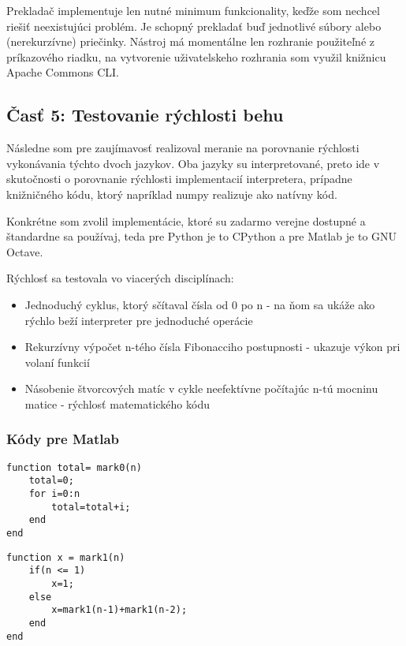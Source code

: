 \documentclass[12pt,a4paper]{article}
\begin{document}
Prekladač implementuje len nutné minimum funkcionality, keďže som nechcel riešiť neexistujúci problém.
Je schopný prekladať buď jednotlivé súbory alebo (nerekurzívne) priečinky.
Nástroj má momentálne len rozhranie použiteľné z príkazového riadku, na vytvorenie uživatelskeho rozhrania som využil knižnicu Apache Commons CLI.

\subsection*{Časť 5: Testovanie rýchlosti behu}

Následne som pre zaujímavosť realizoval meranie na porovnanie rýchlosti vykonávania týchto dvoch jazykov.
Oba jazyky su interpretované, preto ide v skutočnosti o porovnanie rýchlosti implementacií interpretera, prípadne knižničného kódu, ktorý napríklad numpy realizuje ako natívny kód.

Konkrétne som zvolil implementácie, ktoré su zadarmo verejne dostupné a štandardne sa používaj, teda pre Python je to CPython a pre Matlab je to GNU Octave.

Rýchlosť sa testovala vo viacerých disciplínach:
\begin{itemize}
    \item Jednoduchý cyklus, ktorý sčítaval čísla od 0 po n - na ňom sa ukáže ako rýchlo beží interpreter pre jednoduché operácie
    \item Rekurzívny výpočet n-tého čísla Fibonacciho postupnosti - ukazuje výkon pri volaní funkcií
    \item Násobenie štvorcových matíc v cykle neefektívne počítajúc n-tú mocninu matice - rýchlosť matematického kódu
\end{itemize}

\subsubsection*{Kódy pre Matlab}
\lstset{language=Matlab}

\begin{lstlisting}[label={lst:lstlisting1}]
% disciplina 1
function total= mark0(n)
    total=0;
    for i=0:n
        total=total+i;
    end
end
\end{lstlisting}

\begin{lstlisting}[label={lst:lstlisting2}]
% disciplina 2
function x = mark1(n)
	if(n <= 1)
		x=1;
	else
		x=mark1(n-1)+mark1(n-2);
	end
end
\end{lstlisting}
\end{document}
